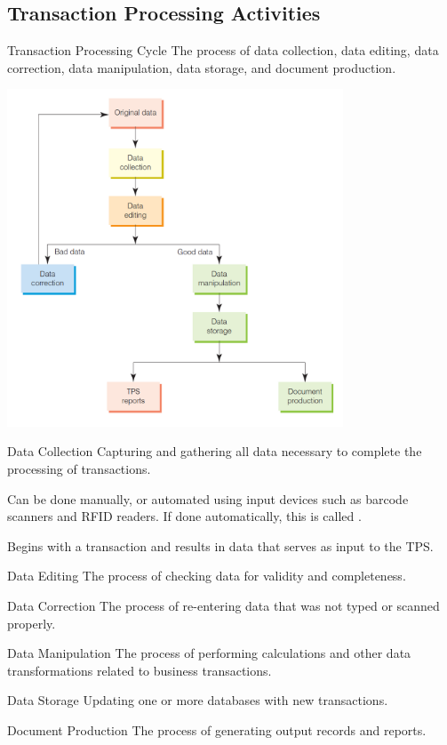 \documentclass[\main/notes.tex]{subfiles}
\begin{document}
			\subsection{Transaction Processing Activities}
				\begin{definition}{Transaction Processing Cycle}
					The process of data collection, data editing, data correction, data manipulation, data storage, and document production.
					\begin{center}
						\includegraphics[width=0.75\textwidth]{chapter07/transaction_lifecycle.png}
					\end{center}
				\end{definition}
				\begin{definition}{Data Collection}
					Capturing and gathering all data necessary to complete the processing of transactions.

					Can be done manually, or automated using input devices such as barcode scanners and RFID readers. If done automatically, this is called .

					Begins with a transaction and results in data that serves as input to the TPS.
				\end{definition}
				\begin{definition}{Data Editing}
					The process of checking data for validity and completeness.
				\end{definition}
				\begin{definition}{Data Correction}
					The process of re-entering data that was not typed or scanned properly.
				\end{definition}
				\begin{definition}{Data Manipulation}
					The process of performing calculations and other data transformations related to business transactions.
				\end{definition}
				\begin{definition}{Data Storage}
					Updating one or more databases with new transactions.
				\end{definition}
				\begin{definition}{Document Production}
					The process of generating output records and reports.
				\end{definition}
\end{document}
